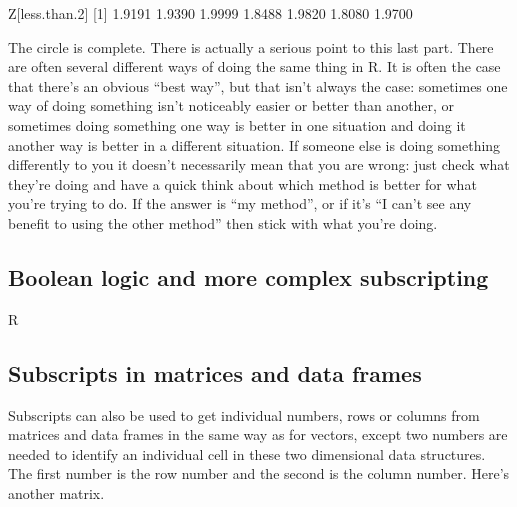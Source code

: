 \documentclass[
]{book}
\newenvironment{Shaded}{\begin{snugshade}}{\end{snugshade}}
\newcommand{\DecValTok}[1]{\textcolor[rgb]{0.00,0.00,0.81}{#1}}
\newcommand{\FloatTok}[1]{\textcolor[rgb]{0.00,0.00,0.81}{#1}}
\newcommand{\NormalTok}[1]{#1}
\begin{document}
\begin{Shaded}
\begin{Highlighting}[]
\NormalTok{Z[less.than}\FloatTok{.2}\NormalTok{]}
\NormalTok{[}\DecValTok{1}\NormalTok{] }\FloatTok{1.9191} \FloatTok{1.9390} \FloatTok{1.9999} \FloatTok{1.8488} \FloatTok{1.9820} \FloatTok{1.8080} \FloatTok{1.9700}
\end{Highlighting}
\end{Shaded}

The circle is complete. There is actually a serious point to this last part. There are often several different ways of doing the same thing in R. It is often the case that there's an obvious ``best way'', but that isn't always the case: sometimes one way of doing something isn't noticeably easier or better than another, or sometimes doing something one way is better in one situation and doing it another way is better in a different situation. If someone else is doing something differently to you it doesn't necessarily mean that you are wrong: just check what they're doing and have a quick think about which method is better for what you're trying to do. If the answer is ``my method'', or if it's ``I can't see any benefit to using the other method'' then stick with what you're doing.

\hypertarget{boolean-logic-and-more-complex-subscripting}{%
\subsection{Boolean logic and more complex subscripting}\label{boolean-logic-and-more-complex-subscripting}}

R

\hypertarget{subscripts-in-matrices-and-data-frames}{%
\subsection{Subscripts in matrices and data frames}\label{subscripts-in-matrices-and-data-frames}}

Subscripts can also be used to get individual numbers, rows or columns from matrices and data frames in the same way as for vectors, except two numbers are needed to identify an individual cell in these two dimensional data structures. The first number is the row number and the second is the column number. Here's another matrix.
\end{document}
